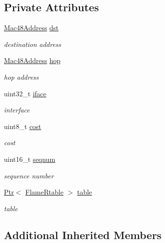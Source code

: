 \subsection*{Private Attributes}
\begin{DoxyCompactItemize}
\item 
\hyperlink{classns3_1_1Mac48Address}{Mac48\+Address} \hyperlink{classFlameRtableTest_a879be62e9afb8a1709d1b1b162114e47}{dst}
\begin{DoxyCompactList}\small\item\em destination address \end{DoxyCompactList}\item 
\hyperlink{classns3_1_1Mac48Address}{Mac48\+Address} \hyperlink{classFlameRtableTest_a5ffa683ad6877934d8dd1ab4ce5f67fb}{hop}
\begin{DoxyCompactList}\small\item\em hop address \end{DoxyCompactList}\item 
uint32\+\_\+t \hyperlink{classFlameRtableTest_a1241ce5c1995bb727ffa76757925fce3}{iface}
\begin{DoxyCompactList}\small\item\em interface \end{DoxyCompactList}\item 
uint8\+\_\+t \hyperlink{classFlameRtableTest_a1532ba6fc14e6e181b0394895293e201}{cost}
\begin{DoxyCompactList}\small\item\em cost \end{DoxyCompactList}\item 
uint16\+\_\+t \hyperlink{classFlameRtableTest_a439706f2f705047c542d395073e059e3}{seqnum}
\begin{DoxyCompactList}\small\item\em sequence number \end{DoxyCompactList}\item 
\hyperlink{classns3_1_1Ptr}{Ptr}$<$ \hyperlink{classns3_1_1flame_1_1FlameRtable}{Flame\+Rtable} $>$ \hyperlink{classFlameRtableTest_afe4986bd7f421b14f53cc6dd56cdf0f8}{table}
\begin{DoxyCompactList}\small\item\em table \end{DoxyCompactList}\end{DoxyCompactItemize}
\subsection*{Additional Inherited Members}


